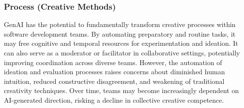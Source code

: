 \subsubsection{Process (Creative Methods)}
GenAI has the potential to fundamentally transform creative processes within software development teams. By automating preparatory and routine tasks, it may free cognitive and temporal resources for experimentation and ideation. It can also serve as a moderator or facilitator in collaborative settings, potentially improving coordination across diverse teams. However, the automation of ideation and evaluation processes raises concerns about diminished human intuition, reduced constructive disagreement, and weakening of traditional creativity techniques. Over time, teams may become increasingly dependent on AI-generated direction, risking a decline in collective creative competence.
